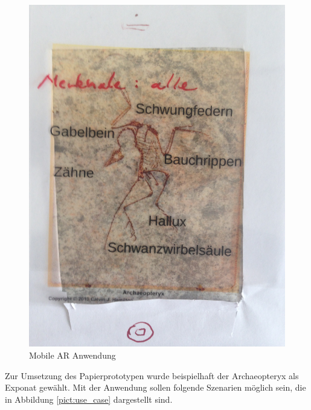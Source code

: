 \documentclass[runningheads,a4paper]{llncs}
\begin{document}
\begin{figure}[H]
	\centering
	\includegraphics[angle=-90,scale=0.04]{proto}
	\caption{Mobile AR Anwendung}
	\label{fig:prototype}
\end{figure} 

Zur Umsetzung des Papierprototypen wurde beispielhaft der Archaeopteryx als Exponat gewählt. Mit der Anwendung sollen folgende Szenarien möglich sein, die in Abbildung \ref{pict:use_case} dargestellt sind.
\end{document}

